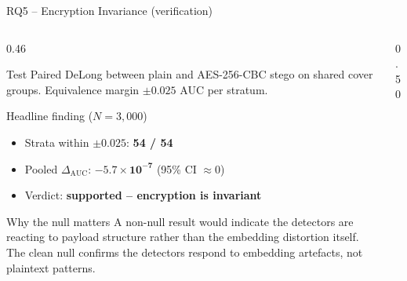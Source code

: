 \documentclass[aspectratio=169,11pt]{beamer}
\begin{document}
\begin{frame}{RQ5 -- Encryption Invariance (verification)}
\scriptsize
\begin{columns}[T]
\begin{column}{0.46\textwidth}
\begin{block}{Test}
Paired DeLong between plain and AES-256-CBC stego on shared cover groups. Equivalence margin $\pm 0.025$ AUC per stratum.
\end{block}
\begin{block}{Headline finding ($N\!=\!3{,}000$)}
\begin{itemize}\setlength{\itemsep}{1pt}
\item Strata within $\pm 0.025$: \textbf{54 / 54}
\item Pooled $\Delta_\text{AUC}$: $\boldsymbol{-5.7\!\times\!10^{-7}}$ (95\% CI $\approx 0$)
\item Verdict: \textbf{supported -- encryption is invariant}
\end{itemize}
\end{block}
\begin{exampleblock}{Why the null matters}
A non-null result would indicate the detectors are reacting to payload structure rather than the embedding distortion itself. The clean null confirms the detectors respond to embedding artefacts, not plaintext patterns.
\end{exampleblock}
\end{column}
\begin{column}{0.50\textwidth}
\begin{center}
\end{center}
\end{column}
\end{columns}
\end{frame}
\end{document}
